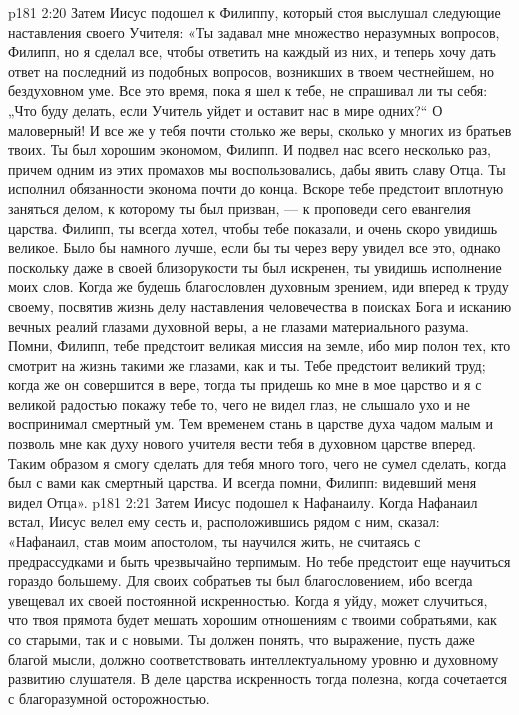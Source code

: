 \vs p181 2:20 \pc Затем Иисус подошел к Филиппу, который стоя выслушал следующие наставления своего Учителя: «Ты задавал мне множество неразумных вопросов, Филипп, но я сделал все, чтобы ответить на каждый из них, и теперь хочу дать ответ на последний из подобных вопросов, возникших в твоем честнейшем, но бездуховном уме. Все это время, пока я шел к тебе, не спрашивал ли ты себя: „Что буду делать, если Учитель уйдет и оставит нас в мире одних?“ О маловерный! И все же у тебя почти столько же веры, сколько у многих из братьев твоих. Ты был хорошим экономом, Филипп. И подвел нас всего несколько раз, причем одним из этих промахов мы воспользовались, дабы явить славу Отца. Ты исполнил обязанности эконома почти до конца. Вскоре тебе предстоит вплотную заняться делом, к которому ты был призван, --- к проповеди сего евангелия царства. Филипп, ты всегда хотел, чтобы тебе показали, и очень скоро увидишь великое. Было бы намного лучше, если бы ты через веру увидел все это, однако поскольку даже в своей близорукости ты был искренен, ты увидишь исполнение моих слов. Когда же будешь благословлен духовным зрением, иди вперед к труду своему, посвятив жизнь делу наставления человечества в поисках Бога и исканию вечных реалий глазами духовной веры, а не глазами материального разума. Помни, Филипп, тебе предстоит великая миссия на земле, ибо мир полон тех, кто смотрит на жизнь такими же глазами, как и ты. Тебе предстоит великий труд; когда же он совершится в вере, тогда ты придешь ко мне в мое царство и я с великой радостью покажу тебе то, чего не видел глаз, не слышало ухо и не воспринимал смертный ум. Тем временем стань в царстве духа чадом малым и позволь мне как духу нового учителя вести тебя в духовном царстве вперед. Таким образом я смогу сделать для тебя много того, чего не сумел сделать, когда был с вами как смертный царства. И всегда помни, Филипп: видевший меня видел Отца».
\vs p181 2:21 \pc Затем Иисус подошел к Нафанаилу. Когда Нафанаил встал, Иисус велел ему сесть и, расположившись рядом с ним, сказал: «Нафанаил, став моим апостолом, ты научился жить, не считаясь с предрассудками и быть чрезвычайно терпимым. Но тебе предстоит еще научиться гораздо большему. Для своих собратьев ты был благословением, ибо всегда увещевал их своей постоянной искренностью. Когда я уйду, может случиться, что твоя прямота будет мешать хорошим отношениям с твоими собратьями, как со старыми, так и с новыми. Ты должен понять, что выражение, пусть даже благой мысли, должно соответствовать интеллектуальному уровню и духовному развитию слушателя. В деле царства искренность тогда полезна, когда сочетается с благоразумной осторожностью.
